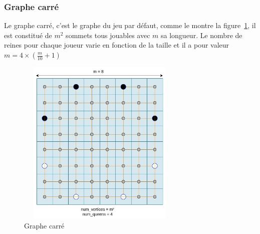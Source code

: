\documentclass[11pt]{article}
\begin{document}
            \subsubsection{Graphe carré}
            Le graphe carré, c'est le graphe du jeu par défaut, comme le montre la figure~\ref{fig:graphc}, il est constitué de $m^{2}$ sommets tous jouables avec $m$ sa longueur. Le nombre de reines pour chaque joueur varie en fonction de la taille et il a pour valeur $m = 4\times(\frac{m}{10} + 1)$
            \begin{figure}[h]
                \centering
                \includegraphics[width = 8cm, height = 8cm]{graphe_carre (3).jpg}
                \caption{Graphe carré}
                \label{fig:graphc}
            \end{figure}
            \newpage
\end{document}
